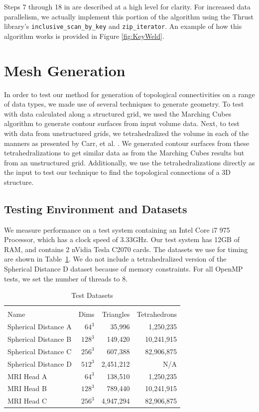 \documentclass[10pt,journal,cspaper,compsoc]{IEEEtran}
\begin{document}
Steps 7 through 18 in  are described at a high level for clarity. For increased data parallelism, we actually implement this portion of the algorithm using the Thrust library's \texttt{inclusive\_scan\_by\_key} and \texttt{zip\_iterator}. An example of how this algorithm works is provided in Figure \ref{fig:KeyWeld}.


\section{Mesh Generation}
In order to test our method for generation of topological connectivities on a range of data types, we made use of several techniques to generate geometry.
To test with data calculated along a structured grid, we used the Marching Cubes algorithm to generate contour surfaces from input volume data. Next, to test
with data from unstructured grids, we tetrahedralized the volume in each of the manners as presented by Carr, et al. \cite{Carr2006}. We generated contour surfaces from these tetrahedralizations
to get similar data as from the Marching Cubes results but from an unstructured grid. Additionally, we use the tetrahedralizations directly as the input to test our technique
to find the topological connections of a 3D structure.


\subsection{Testing Environment and Datasets}

We measure performance on a test system containing an Intel Core i7 975 Processor, which has a clock speed of 3.33GHz. Our test system has 12GB of RAM, and contains 2 nVidia Tesla C2070 cards. The datasets we use for timing are shown in Table~\ref{tab:datasets}.  We do not include a tetrahedralized version of the Spherical Distance D dataset because of memory constraints. For all OpenMP tests, we set the number of threads to 8.


\begin{table}[tb!]
\begin{center}
\caption{Test Datasets}
\label{tab:datasets}
\begin{tabular}{l r r r}
\multicolumn{4}{c}{ } \\
Name & Dims &  Triangles & Tetrahedrons \\
\hline
Spherical Distance A & $64^3 $ & 35,996    & 1,250,235 \\
Spherical Distance B & $128^3$ & 149,420   & 10,241,915 \\
Spherical Distance C & $256^3$ & 607,388   & 82,906,875 \\
Spherical Distance D & $512^3$ & 2,451,212 & N/A \\
MRI Head A           & $64^3 $ & 138,510   & 1,250,235 \\
MRI Head B           & $128^3$ & 789,440   & 10,241,915 \\
MRI Head C           & $256^3$ & 4,947,294 & 82,906,875  \\
\end{tabular}
\end{center}
\end{table}
\end{document}
